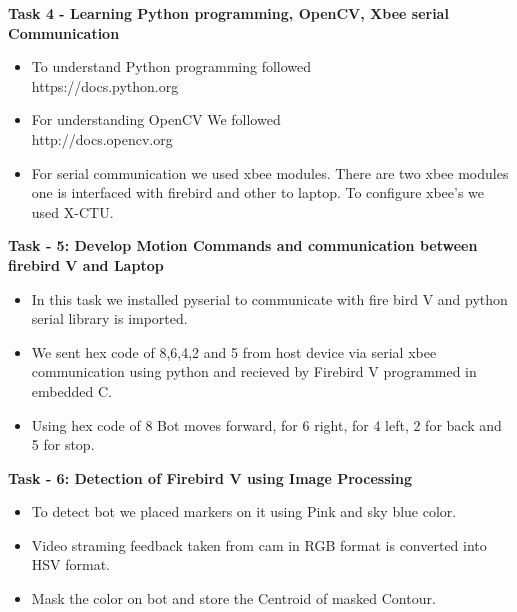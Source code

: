 \documentclass[report]{res}
\begin{document}
   	\pagebreak
   	
   	
	{\Large \textbf{Task 4 - Learning Python programming, OpenCV, Xbee serial Communication}}\\
	
	\begin{itemize}
		 
		\item To understand Python programming followed \\
		https://docs.python.org \\
		\item For understanding OpenCV We followed\\
		http://docs.opencv.org \\
		\item For serial communication we used xbee modules. There are two xbee modules one is interfaced with firebird and other to laptop. To configure xbee's we used X-CTU.\\
	
	\end{itemize}	
	 
	{\Large \textbf{Task - 5: Develop Motion Commands and communication between firebird V and Laptop}} \\
	
		\begin{itemize}
			
		\item In this task we installed pyserial to communicate with fire bird V and python serial library is imported. 
		\item We sent hex code of 8,6,4,2 and 5 from host device via serial xbee communication using python and recieved by Firebird V programmed in embedded C. 
		\item Using hex code of 8 Bot moves forward, for 6 right, for 4 left, 2 for back and 5 for stop.\\
	
		\end{itemize} 
		
	{\Large \textbf{Task - 6: Detection of Firebird V using Image Processing}} \\
		\begin{itemize}
			
		\item To detect bot we placed markers on it using Pink and sky blue color. 
		\item Video straming feedback taken from cam in RGB format is converted into HSV format.
		\item Mask the color on bot and store the Centroid of masked Contour. \\
		
		\end{itemize}
		
\end{document}
